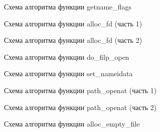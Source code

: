\clearpage

\vspace*{\fill}
\begin{figure}[h]
    \centering
    \def\svgwidth{\textwidth}
    
    \caption{Схема алгоритма функции getname\_flags}
\end{figure}
\vfill

\clearpage

\vspace*{\fill}
\begin{figure}[h]
    \centering
    \def\svgwidth{0.7\textwidth}
    
    \caption{Схема алгоритма функции alloc\_fd (часть 1)}
\end{figure}
\vfill

\clearpage

\vspace*{\fill}
\begin{figure}[h]
    \centering
    \def\svgwidth{0.7\textwidth}
    
    \caption{Схема алгоритма функции alloc\_fd (часть 2)}
\end{figure}
\vfill

\clearpage

\vspace*{\fill}
\begin{figure}[h]
    \centering
    \def\svgwidth{0.9\textwidth}
    
    \caption{Схема алгоритма функции do\_filp\_open}
\end{figure}
\vfill

\clearpage

\vspace*{\fill}
\begin{figure}[h]
    \centering
    \def\svgwidth{\textwidth}
    
    \caption{Схема алгоритма функции set\_nameidata}
\end{figure}
\vfill

\clearpage

\vspace*{\fill}
\begin{figure}[h]
    \centering
    \def\svgwidth{\textwidth}
    
    \caption{Схема алгоритма функции path\_openat (часть 1)}
\end{figure}
\vfill

\clearpage

\vspace*{\fill}
\begin{figure}[h]
    \centering
    \def\svgwidth{0.6\textwidth}
    
    \caption{Схема алгоритма функции path\_openat (часть 2)}
\end{figure}
\vfill
\begin{figure}[h]
    \centering
    \def\svgwidth{0.85\textwidth}
    
    \caption{Схема алгоритма функции alloc\_empty\_file}
\end{figure}
\vfill


